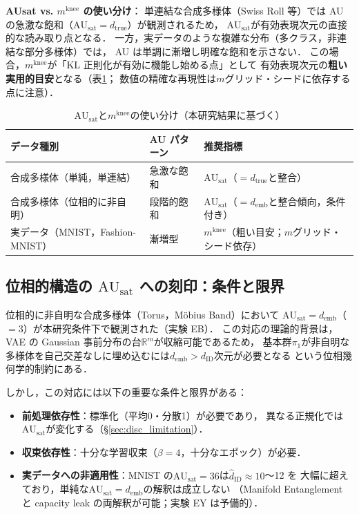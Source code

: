 \documentclass[11pt,a4paper]{jsarticle}
\newcommand{\dID}{d_{\mathrm{ID}}}
\newcommand{\dtrue}{d_{\mathrm{true}}}
\newcommand{\R}{\mathbb{R}}
\newcommand{\AUsat}{\mathrm{AU}_{\mathrm{sat}}}
\newcommand{\mknee}{m^{\mathrm{knee}}}
\newcommand{\demb}{d_{\mathrm{emb}}}
\begin{document}
\textbf{AUsat vs. $\mknee$ の使い分け}：
単連結な合成多様体（Swiss Roll 等）では AU の急激な飽和（$\AUsat = \dtrue$）が観測されるため，
$\AUsat$が有効表現次元の直接的な読み取り点となる．
一方，実データのような複雑な分布（多クラス，非連結な部分多様体）では，
AU は単調に漸増し明確な飽和を示さない．
この場合，$\mknee$が「KL 正則化が有効に機能し始める点」として
有効表現次元の\textbf{粗い実用的目安}となる（表\ref{tab:au_comparison}；
数値の精確な再現性は$m$グリッド・シードに依存する点に注意）．

\begin{table}[H]
\centering
\caption{$\AUsat$と$\mknee$の使い分け（本研究結果に基づく）}
\label{tab:au_comparison}
\small
\begin{tabular}{lll}
\toprule
データ種別 & AU パターン & 推奨指標 \\
\midrule
合成多様体（単純，単連結） & 急激な飽和 & $\AUsat$（$= \dtrue$と整合） \\
合成多様体（位相的に非自明） & 段階的飽和 & $\AUsat$（$= \demb$と整合傾向，条件付き） \\
実データ（MNIST，Fashion-MNIST） & 漸増型 & $\mknee$（粗い目安；$m$グリッド・シード依存） \\
\bottomrule
\end{tabular}
\end{table}

\subsection{位相的構造の $\AUsat$ への刻印：条件と限界}\label{sec:disc_topology}

位相的に非自明な合成多様体（Torus，Möbius Band）において
$\AUsat = \demb$（$= 3$）が本研究条件下で観測された（実験 EB）．
この対応の理論的背景は，VAE の Gaussian 事前分布の台$\R^m$が収縮可能であるため，
基本群$\pi_1$が非自明な多様体を自己交差なしに埋め込むには$\demb > \dID$次元が必要となる
という位相幾何学的制約\cite{hatcher2002algebraic,guillemin1974differential}にある．

しかし，この対応には以下の重要な条件と限界がある：
\begin{itemize}
  \item \textbf{前処理依存性}：標準化（平均0・分散1）が必要であり，
        異なる正規化では$\AUsat$が変化する（§\ref{sec:disc_limitation}）．
  \item \textbf{収束依存性}：十分な学習収束（$\beta = 4$，十分なエポック）が必要．
  \item \textbf{実データへの非適用性}：MNIST の$\AUsat = 36$は$\hat{d}_\mathrm{ID} \approx 10$〜12 を
        大幅に超えており，単純な$\AUsat = \demb$の解釈は成立しない
        （Manifold Entanglement と capacity leak の両解釈が可能；実験 EY は予備的）．
\end{itemize}
\end{document}
